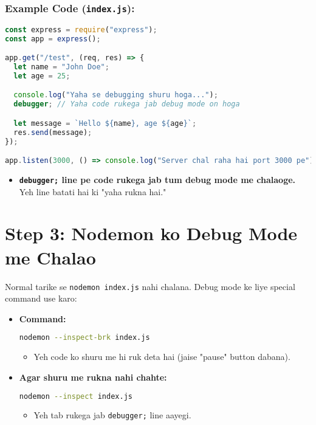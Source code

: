 \documentclass[a4paper,12pt]{article}
\begin{document}
\subsubsection{Example Code (\texttt{\color{mygreen}index.js}):}
\begin{lstlisting}[language=JavaScript]
const express = require("express");
const app = express();

app.get("/test", (req, res) => {
  let name = "John Doe";
  let age = 25;

  console.log("Yaha se debugging shuru hoga...");
  debugger; // Yaha code rukega jab debug mode on hoga

  let message = `Hello ${name}, age ${age}`;
  res.send(message);
});

app.listen(3000, () => console.log("Server chal raha hai port 3000 pe"));
\end{lstlisting}
\begin{itemize}
    \item \textbf{\color{myblue}\texttt{\color{mygreen}debugger;} line pe code rukega jab tum debug mode me chalaoge.} Yeh line batati hai ki "yaha rukna hai."
\end{itemize}

\section{Step 3: Nodemon ko Debug Mode me Chalao}
Normal tarike se \texttt{\color{mygreen}nodemon index.js} nahi chalana. Debug mode ke liye special command use karo:  
\begin{itemize}
    \item \textbf{\color{myblue}Command:}  
    \begin{lstlisting}[language=Bash]
nodemon --inspect-brk index.js
    \end{lstlisting}
    \begin{itemize}
        \item Yeh code ko shuru me hi ruk deta hai (jaise "pause" button dabana).
    \end{itemize}
    \item \textbf{\color{myblue}Agar shuru me rukna nahi chahte:}  
    \begin{lstlisting}[language=Bash]
nodemon --inspect index.js
    \end{lstlisting}
    \begin{itemize}
        \item Yeh tab rukega jab \texttt{\color{mygreen}debugger;} line aayegi.
    \end{itemize}
\end{itemize}
\end{document}
